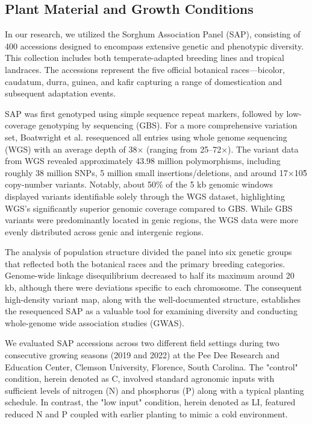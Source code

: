 \documentclass[10pt,letterpaper]{article}
\begin{document}
\subsection*{Plant Material and Growth Conditions}
In our research, we utilized the Sorghum Association Panel (SAP), consisting of 400 accessions designed to encompass extensive genetic and phenotypic diversity. This collection includes both temperate-adapted breeding lines and tropical landraces. The accessions represent the five official botanical races—bicolor, caudatum, durra, guinea, and kafir capturing a range of domestication and subsequent adaptation events.

SAP was first genotyped using simple sequence repeat markers, followed by low-coverage genotyping by sequencing (GBS). For a more comprehensive variation set, Boatwright et al. resequenced all entries using whole genome sequencing (WGS) with an average depth of 38× (ranging from 25–72×). The variant data from WGS revealed approximately 43.98 million polymorphisms, including roughly 38 million SNPs, 5 million small insertions/deletions, and around 17×10\^5 copy-number variants. Notably, about 50\% of the 5 kb genomic windows displayed variants identifiable solely through the WGS dataset, highlighting WGS's significantly superior genomic coverage compared to GBS. While GBS variants were predominantly located in genic regions, the WGS data were more evenly distributed across genic and intergenic regions.

The analysis of population structure divided the panel into six genetic groups that reflected both the botanical races and the primary breeding categories. Genome-wide linkage disequilibrium decreased to half its maximum around 20 kb, although there were deviations specific to each chromosome. The consequent high-density variant map, along with the well-documented structure, establishes the resequenced SAP as a valuable tool for examining diversity and conducting whole-genome wide association studies (GWAS).

We evaluated SAP accessions across two different field settings during two consecutive growing seasons (2019 and 2022) at the Pee Dee Research and Education Center, Clemson University, Florence, South Carolina. The "control" condition, herein denoted as C, involved standard agronomic inputs with sufficient levels of nitrogen (N) and phosphorus (P) along with a typical planting schedule. In contrast, the "low input" condition, herein denoted as LI,  featured reduced N and P coupled with earlier planting to mimic a cold environment.
\end{document}
